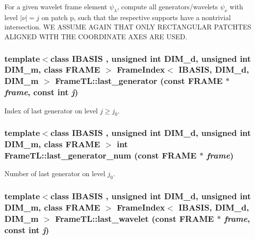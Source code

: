 For a given wavelet frame element $\psi_\lambda$, compute all generators/wavelets $\psi_\nu$ with level $|\nu|=j$ on patch p, such that the respective supports have a nontrivial intersection. WE ASSUME AGAIN THAT ONLY RECTANGULAR PATCHTES ALIGNED WITH THE COORDINATE AXES ARE USED. \hypertarget{namespaceFrameTL_a6650ac9337756c12f5022699c50cc28}{
\subsubsection[{last\_\-generator}]{\setlength{\rightskip}{0pt plus 5cm}template$<$class IBASIS , unsigned int DIM\_\-d, unsigned int DIM\_\-m, class FRAME $>$ {\bf FrameIndex}$<$ IBASIS, DIM\_\-d, DIM\_\-m $>$ FrameTL::last\_\-generator (const FRAME $\ast$ {\em frame}, \/  const int {\em j})}}
\label{namespaceFrameTL_a6650ac9337756c12f5022699c50cc28}


Index of last generator on level $j \geq j_0$. \hypertarget{namespaceFrameTL_0544af1a279910dc8bcdb9b542df3166}{
\subsubsection[{last\_\-generator\_\-num}]{\setlength{\rightskip}{0pt plus 5cm}template$<$class IBASIS , unsigned int DIM\_\-d, unsigned int DIM\_\-m, class FRAME $>$ int FrameTL::last\_\-generator\_\-num (const FRAME $\ast$ {\em frame})}}
\label{namespaceFrameTL_0544af1a279910dc8bcdb9b542df3166}


Number of last generator on level $j_0$. \hypertarget{namespaceFrameTL_7c29f890e91e2cd966b9ac6b773277cf}{
\subsubsection[{last\_\-wavelet}]{\setlength{\rightskip}{0pt plus 5cm}template$<$class IBASIS , unsigned int DIM\_\-d, unsigned int DIM\_\-m, class FRAME $>$ {\bf FrameIndex}$<$ IBASIS, DIM\_\-d, DIM\_\-m $>$ FrameTL::last\_\-wavelet (const FRAME $\ast$ {\em frame}, \/  const int {\em j})}}
\label{namespaceFrameTL_7c29f890e91e2cd966b9ac6b773277cf}



